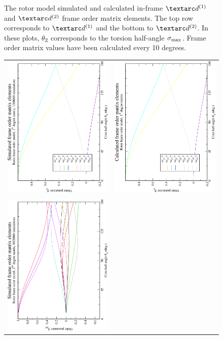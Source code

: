 \begin{figure}
\begin{tabular}{@{}cc@{}}
  \end{tabular}
  \caption[Rotor simulated and calculated in-frame $\FOone$ and $\FOtwo$ elements.]{
    The rotor model simulated and calculated in-frame $\FOone$ and $\FOtwo$ frame order matrix elements.
    The top row corresponds to $\FOone$ and the bottom to $\FOtwo$.
    In these plots, $\theta_\textrm{Z}$ corresponds to the torsion half-angle $\sigma_\textrm{max}$.
    Frame order matrix values have been calculated every 10 degrees.
  }
  \label{fig: simulated and calculated in-frame 1st and 2nd degree rotor frame order}
\end{figure}

\begin{figure}
\centering
  \begin{tabular}{@{}cc@{}}
    \includegraphics[width=.35\textwidth,angle=270]{images/frame_order_matrix/Sij_rotor_out_of_frame_theta_z_ens1000000.eps} &
    \includegraphics[width=.35\textwidth,angle=270]{images/frame_order_matrix/Sij_rotor_out_of_frame_theta_z_calc.eps} \\
    \\[-5pt]
    \includegraphics[width=.35\textwidth,angle=270]{images/frame_order_matrix/Sijkl_rotor_out_of_frame_theta_z_ens1000000.eps} &

\end{tabular}
\end{figure}
